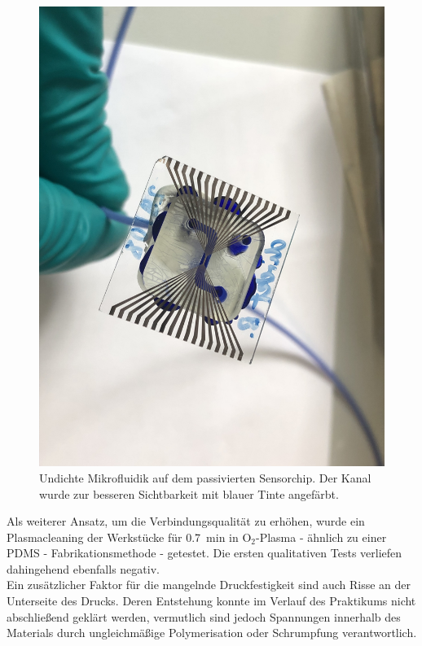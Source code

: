 \begin{figure}[!ht]
    \centering
    \includegraphics[trim=75 450 100 400mm, clip, width=1.0\textwidth]{img/MIKRORISS.jpeg}
    \caption{Undichte Mikrofluidik auf dem passivierten Sensorchip. Der Kanal wurde zur besseren Sichtbarkeit mit blauer Tinte angefärbt.}
    \label{fig:Mikrofluidik_undicht}
\end{figure}

Als weiterer Ansatz, um die Verbindungsqualität zu erhöhen, wurde ein Plasmacleaning der Werkstücke für \SI{0.7}{\minute} in O$_2$-Plasma - ähnlich zu einer PDMS - Fabrikationsmethode - getestet. Die ersten qualitativen Tests verliefen dahingehend ebenfalls negativ.\\

Ein zusätzlicher Faktor für die mangelnde Druckfestigkeit sind auch Risse an der Unterseite des Drucks. Deren Entstehung konnte im Verlauf des Praktikums nicht abschließend geklärt werden, vermutlich sind jedoch Spannungen innerhalb des Materials durch ungleichmäßige Polymerisation oder Schrumpfung verantwortlich.


